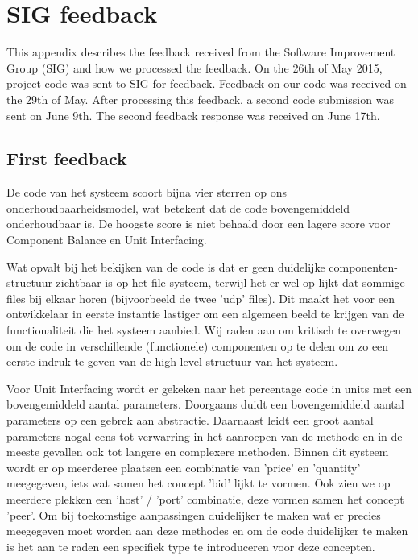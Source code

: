 \section{SIG feedback}
\label{SIG}
This appendix describes the feedback received from the Software Improvement Group (SIG) and how we processed the feedback.
On the 26th of May 2015, project code was sent to SIG for feedback.
Feedback on our code was received on the 29th of May.
After processing this feedback, a second code submission was sent on June 9th.
The second feedback response was received on June 17th.

\subsection{First feedback}

De code van het systeem scoort bijna vier sterren op ons onderhoudbaarheidsmodel, wat betekent dat de code bovengemiddeld onderhoudbaar is.
De hoogste score is niet behaald door een lagere score voor Component Balance en Unit Interfacing.


Wat opvalt bij het bekijken van de code is dat er geen duidelijke componenten-structuur zichtbaar is op het file-systeem, terwijl het er wel op lijkt dat sommige files bij elkaar horen (bijvoorbeeld de twee 'udp' files).
Dit maakt het voor een ontwikkelaar in eerste instantie lastiger om een algemeen beeld te krijgen van de functionaliteit die het systeem aanbied.
Wij raden aan om kritisch te overwegen om de code in verschillende (functionele) componenten op te delen om zo een eerste indruk te geven van de high-level structuur van het systeem.


Voor Unit Interfacing wordt er gekeken naar het percentage code in units met een bovengemiddeld aantal parameters.
Doorgaans duidt een bovengemiddeld aantal parameters op een gebrek aan abstractie.
Daarnaast leidt een groot aantal parameters nogal eens tot verwarring in het aanroepen van de methode en in de meeste gevallen ook tot langere en complexere methoden.
Binnen dit systeem wordt er op meerderee plaatsen een combinatie van 'price' en 'quantity' meegegeven, iets wat samen het concept 'bid' lijkt te vormen.
Ook zien we op meerdere plekken een 'host' / 'port' combinatie, deze vormen samen het concept 'peer'.
Om bij toekomstige aanpassingen duidelijker te maken wat er precies meegegeven moet worden aan deze methodes en om de code duidelijker te maken is het aan te raden een specifiek type te introduceren voor deze concepten.


